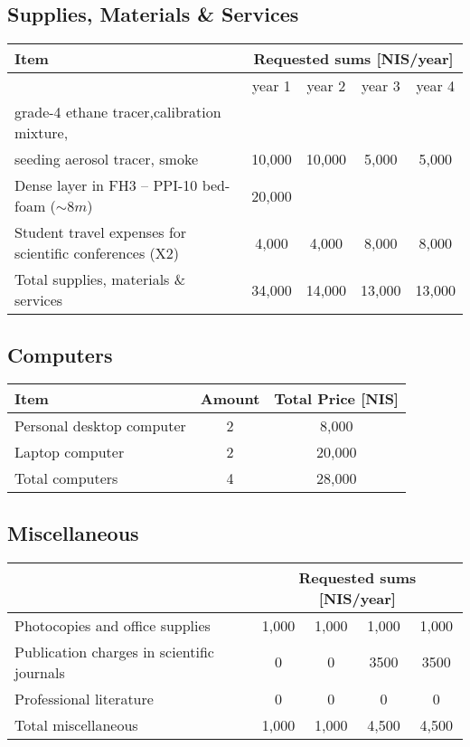 \documentclass[a4paper,12pt]{report}
\begin{document}
\newpage
\subsection*{Supplies, Materials \& Services }

\begin{table}[h!]
\centering
\begin{tabular}{|l|c|c|c|c|}
\hline
Item     & \multicolumn{4}{|c|}{Requested sums [NIS/year]} \\
\hline
         & 
year 1 & year 2 & year 3 & year 4 \\
\hline
grade-4 ethane tracer,calibration mixture,& & & & \\
seeding aerosol tracer, smoke & 
10,000 & 10,000 & 5,000 & 5,000 \\
\hline
Dense layer in FH3 --  PPI-10 bed-foam ($\sim 8 m$) & 20,000 &&&\\
\hline
Student travel expenses for scientific conferences (X2) &
4,000 & 4,000 & 8,000 & 8,000 \\
\hline
\hline
Total supplies, materials \& services & 
34,000 & 14,000 & 13,000 & 13,000\\
\hline
\end{tabular}
\end{table}



\subsection*{Computers}

\begin{table}[h!]
\centering
\begin{tabular}{|l|c|c|}
\hline
  Item  & Amount & Total Price [NIS] \\
\hline
Personal desktop computer & 2 & 8,000  \\
\hline 
Laptop computer & 2 & 20,000\\
\hline
\hline
Total  computers & 4 & 28,000\\
\hline
\end{tabular}
\end{table}


\subsection*{Miscellaneous }

\begin{table}[h!]
\centering
\begin{tabular}{|l|c|c|c|c|}
\hline
    & \multicolumn{4}{|c|}{Requested sums [NIS/year]} \\
\hline
 Photocopies and office supplies& 
1,000 & 1,000 & 1,000 & 1,000 \\
\hline
Publication charges in scientific journals &  
0 & 0 & 3500 & 3500 \\
\hline
Professional literature &
0 & 0 & 0 & 0\\
\hline\hline
Total miscellaneous & 
1,000 & 1,000 & 4,500 & 4,500\\
\hline
\end{tabular}
\end{table}
\end{document}
